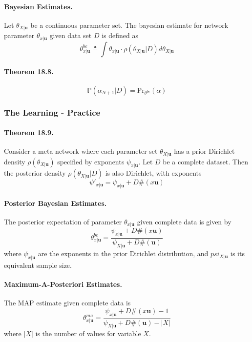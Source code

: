 \documentclass[11pt]{article}
\newcommand{\bu}{\mathbf{u}}
\newcommand{\pr}{\mathrm{Pr}}
\begin{document}
\paragraph{Bayesian Estimates.} Let $\theta _{X | \bu}$ be a continuous parameter set. The bayesian estimate for network parameter $\theta_{x | \bu}$ given data set $D$ is defined as 
\begin{equation}
	\theta_{x | \bu }^{be} \triangleq \int \theta_{x | \bu} \cdot \rho ( \theta _{X | \bu} | D) d \theta_{X | \bu}
\end{equation}

\paragraph{Theorem 18.8.} 
\begin{equation}
	\mathbb P ( \alpha_{N + 1} | D) = \pr_{\theta^{be}} (\alpha)
\end{equation}

\subsubsection{The Learning - Practice}
\paragraph{Theorem 18.9.} 
Consider a meta network where each parameter set $\theta_{X| \bu}$ has a prior Dirichlet density $\rho ( \theta _ {X | \bu} )$ specified by exponents $\psi_{x | \bu} $. Let $D$ be a complete dataset. Then the posterior density $\rho ( \theta _{X| \bu} | D)$ is also Dirichlet, with exponents
\begin{equation}
	\psi ' _{x | \bu} = \psi _{x|\bu} + D \# (x \bu)
\end{equation}

\paragraph{Posterior Bayesian Estimates.} The posterior expectation of parameter $\theta_{x | \bu}$ given complete data is given by
\begin{equation}
	\theta^{be}_{x | \bu} = \frac{\psi_{x |\bu} + D\# (x \bu)}{\psi_{X | \bu} + D \# (\bu) }
\end{equation}
where $\psi_{x |\bu}$ are the exponents in the prior Dirichlet distribution, and $psi_{X |\bu}$ is its equivalent sample size. 

\paragraph{Maximum-A-Posteriori Estimates.} The MAP estimate given complete data is 
\begin{equation}
	\theta_{x | \bu}^{ma} = \frac{\psi_{x |\bu} + D\# (x \bu) - 1}{\psi_{X | \bu} + D \# (\bu) - |X|}
\end{equation}
where $|X|$ is the number of values for variable $X$.
\end{document}
